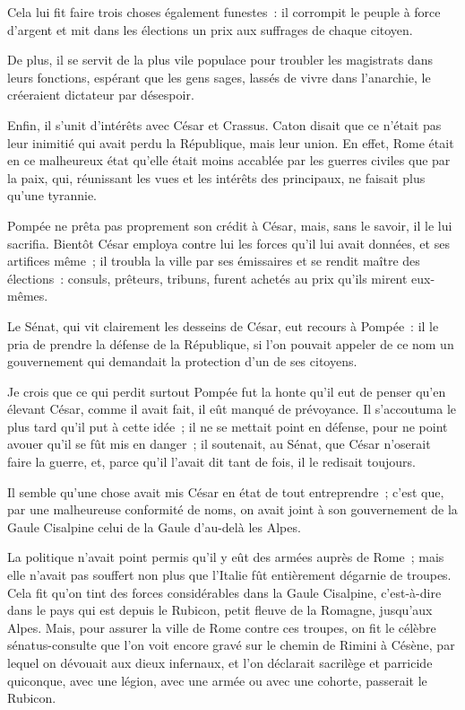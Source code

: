 \documentclass[french,twoside]{book} %
\begin{document}
Cela lui fit faire trois choses également funestes : il corrompit le peuple à force d’argent et mit dans les élections un prix aux suffrages de chaque citoyen.\par
De plus, il se servit de la plus vile populace pour troubler les magistrats dans leurs fonctions, espérant que les gens sages, lassés de vivre dans l’anarchie, le créeraient dictateur par désespoir.\par
Enfin, il s’unit d’intérêts avec César et Crassus. Caton disait que ce n’était pas leur inimitié qui avait perdu la République, mais leur union. En effet, Rome était en ce malheureux état qu’elle était moins accablée par les guerres civiles que par la paix, qui, réunissant les vues et les intérêts des principaux, ne faisait plus qu’une tyrannie.\par
Pompée ne prêta pas proprement son crédit à César, mais, sans le savoir, il le lui sacrifia. Bientôt César employa contre lui les forces qu’il lui avait données, et ses artifices même ; il troubla la ville par ses émissaires et se rendit maître des élections : consuls, prêteurs, tribuns, furent achetés au prix qu’ils mirent eux-mêmes.\par
Le Sénat, qui vit clairement les desseins de César, eut recours à Pompée : il le pria de prendre la défense de la République, si l’on pouvait appeler de ce nom un gouvernement qui demandait la protection d’un de ses citoyens.\par
Je crois que ce qui perdit surtout Pompée fut la honte qu’il eut de penser qu’en élevant César, comme il avait fait, il eût manqué de prévoyance. Il s’accoutuma le plus tard qu’il put à cette idée ; il ne se mettait point en défense, pour ne point avouer qu’il se fût mis en danger ; il soutenait, au Sénat, que César n’oserait faire la guerre, et, parce qu’il l’avait dit tant de fois, il le redisait toujours.\par
Il semble qu’une chose avait mis César en état de tout entreprendre ; c’est que, par une malheureuse conformité de noms, on avait joint à son gouvernement de la Gaule Cisalpine celui de la Gaule d’au-delà les Alpes.\par
La politique n’avait point permis qu’il y eût des armées auprès de Rome ; mais elle n’avait pas souffert non plus que l’Italie fût entièrement dégarnie de troupes. Cela fit qu’on tint des forces considérables dans la Gaule Cisalpine, c’est-à-dire dans le pays qui est depuis le Rubicon, petit fleuve de la Romagne, jusqu’aux Alpes. Mais, pour assurer la ville de Rome contre ces troupes, on fit le célèbre sénatus-consulte que l’on voit encore gravé sur le chemin de Rimini à Césène, par lequel on dévouait aux dieux infernaux, et l’on déclarait sacrilège et parricide quiconque, avec une légion, avec une armée ou avec une cohorte, passerait le Rubicon.\par
\end{document}
